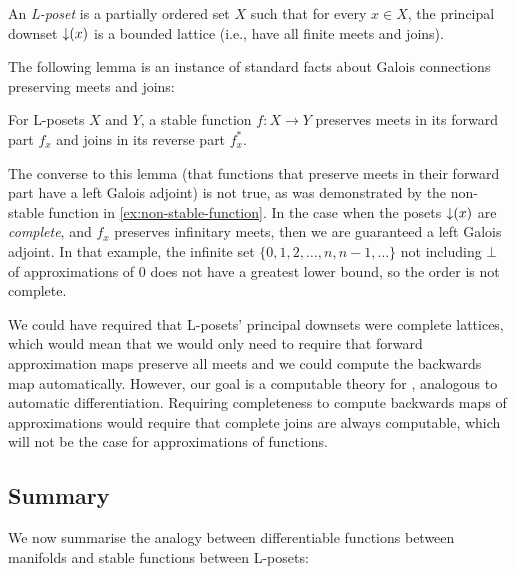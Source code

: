 \begin{definition}
  An \emph{L-poset} is a partially ordered set $X$ such that for every
  $x \in X$, the principal downset $\mathop{\downarrow}(x)$ is a bounded lattice
  (i.e., have all finite meets and joins).
\end{definition}

The following lemma is an instance of standard facts about Galois connections preserving meets and joins:

\begin{lemma}
  For L-posets $X$ and $Y$, a stable function $f : X \to Y$ preserves
  meets in its forward part $f_x$ and joins in its reverse part
  $f^*_x$.
\end{lemma}

The converse to this lemma (that functions that preserve meets in
their forward part have a left Galois adjoint) is not true, as was
demonstrated by the non-stable function in
\autoref{ex:non-stable-function}. In the case when the posets
$\mathop{\downarrow}(x)$ are \emph{complete}, and $f_x$ preserves infinitary
meets, then we are guaranteed a left Galois adjoint. In that example,
the infinite set $\{0, 1, 2, \dots, n, n-1, \dots\}$ not including
$\bot$ of approximations of $0$ does not have a greatest lower bound,
so the order is not complete.

We could have required that L-posets' principal downsets were complete
lattices, which would mean that we would only need to require that
forward approximation maps preserve all meets and we could compute the
backwards map automatically. However, our goal is a computable theory
for \GPS, analogous to automatic differentiation. Requiring
completeness to compute backwards maps of approximations would require
that complete joins are always computable, which will not be the case for approximations of functions.

\subsection{Summary}
\label{sec:diff-stab-summary}

We now summarise the analogy between differentiable functions between manifolds and stable functions between L-posets:

